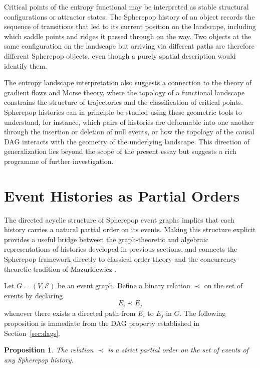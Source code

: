 \documentclass[12pt]{article}
\theoremstyle{plain}
\newtheorem{proposition}[theorem]{Proposition}
\theoremstyle{definition}
\theoremstyle{remark}
\begin{document}
Critical points of the entropy functional may be interpreted as stable
structural configurations or attractor states.  The Spherepop history of an
object records the sequence of transitions that led to its current position on
the landscape, including which saddle points and ridges it passed through on
the way.  Two objects at the same configuration on the landscape but arriving
via different paths are therefore different Spherepop objects, even though a
purely spatial description would identify them.

The entropy landscape interpretation also suggests a connection to the theory
of gradient flows and Morse theory, where the topology of a functional landscape
constrains the structure of trajectories and the classification of critical
points.  Spherepop histories can in principle be studied using these geometric
tools to understand, for instance, which pairs of histories are deformable into
one another through the insertion or deletion of null events, or how the
topology of the causal DAG interacts with the geometry of the underlying
landscape.  This direction of generalization lies beyond the scope of the
present essay but suggests a rich programme of further investigation.


\section{Event Histories as Partial Orders}
\label{sec:posets}

The directed acyclic structure of Spherepop event graphs implies that each
history carries a natural partial order on its events.  Making this structure
explicit provides a useful bridge between the graph-theoretic and algebraic
representations of histories developed in previous sections, and connects the
Spherepop framework directly to classical order theory and the concurrency-
theoretic tradition of Mazurkiewicz \citep{Mazurkiewicz1987}.

Let $G = (V, \mathcal{E})$ be an event graph.  Define a binary relation
$\prec$ on the set of events by declaring
\[
  E_i \prec E_j
\]
whenever there exists a directed path from $E_i$ to $E_j$ in $G$.  The
following proposition is immediate from the DAG property established in
Section~\ref{sec:dags}.

\begin{proposition}
The relation $\prec$ is a strict partial order on the set of events of any
Spherepop history.
\end{proposition}
\end{document}
